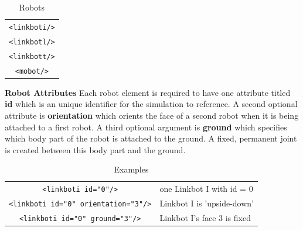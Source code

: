 \documentclass{article}
\begin{document}
\begin{table}[H]
	\begin{center}
	\begin{tabular}{c}
		\hline \hline
		\verb|<linkboti/>| \\
		\verb|<linkbotl/>| \\
		\verb|<linkbott/>| \\
		\verb|<mobot/>| \\
		\hline \hline
	\end{tabular}
	\caption{Robots}
	\label{tab:robots}
	\end{center}
\end{table}

\noindent
\newline
\textbf{Robot Attributes}
\newline
Each robot element is required to have one attribute titled \textbf{id} which is
an unique identifier for the simulation to reference.  A second optional
attribute is \textbf{orientation} which orients the face of a second robot when
it is being attached to a first robot.  A third optional argument is
\textbf{ground} which specifies which body part of the robot is attached to the
ground.  A fixed, permanent joint is created between this body part and the
ground.

\begin{table}[H]
	\begin{center}
	\begin{tabular}{c | l}
		\hline \hline
		\verb|<linkboti id="0"/>| & one Linkbot I with id = 0 \\
		\verb|<linkboti id="0" orientation="3"/>| & Linkbot I is 'upside-down' \\
		\verb|<linkboti id="0" ground="3"/>| & Linkbot I's face 3 is fixed \\
		\hline \hline
	\end{tabular}
	\caption{Examples}
	\label{tab:ex}
	\end{center}
\end{table}
\end{document}
